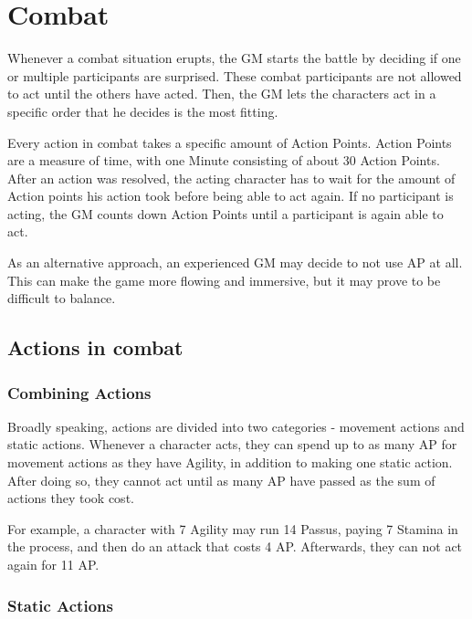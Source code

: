 
\chapter{Combat}
Whenever a combat situation erupts, the GM starts the battle by deciding if one or multiple participants are surprised. These combat participants are not allowed to act until the others have acted. Then, the GM lets the characters act in a specific order that he decides is the most fitting.

Every action in combat takes a specific amount of Action Points. Action Points are a measure of time, with one Minute consisting of about 30 Action Points. After an action was resolved, the acting character has to wait for the amount of Action points his action took before being able to act again. If no participant is acting, the GM counts down Action Points until a participant is again able to act.

As an alternative approach, an experienced GM may decide to not use AP at all. This can make the game more flowing and immersive, but it may prove to be difficult to balance.


\section{Actions in combat}

\subsection{Combining Actions}
Broadly speaking, actions are divided into two categories - movement actions and static actions. Whenever a character acts, they can spend up to as many AP for movement actions as they have Agility, in addition to making one static action. After doing so, they cannot act until as many AP have passed as the sum of actions they took cost.

For example, a character with 7 Agility may run 14 Passus, paying 7 Stamina in the process, and then do an attack that costs 4 AP. Afterwards, they can not act again for 11 AP.

\subsection{Static Actions}

